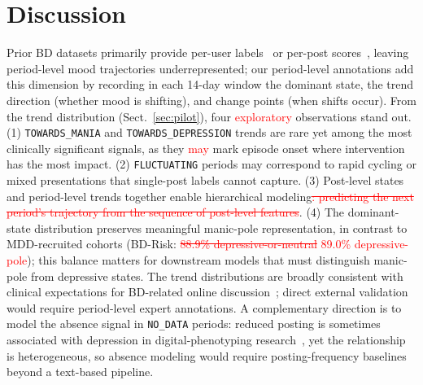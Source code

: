 \documentclass[runningheads]{llncs}
\newcommand{\rev}[1]{\textcolor{red}{#1}}
\newcommand{\del}[1]{\textcolor{red}{\sout{#1}}}
\newcommand{\rev}[1]{#1}
\newcommand{\del}[1]{}
\begin{document}
\section{Discussion}
\label{sec:discussion}

Prior BD datasets primarily provide per-user labels~\cite{cohan2018smhd,sekulic2018not} or per-post scores~\cite{lee2024detecting}, leaving period-level mood trajectories underrepresented; our period-level annotations add this dimension by recording in each 14-day window the dominant state, the trend direction (whether mood is shifting), and change points (when shifts occur). From the trend distribution (Sect.~\ref{sec:pilot}), four \rev{exploratory} observations stand out. (1) \texttt{TOWARDS\_MANIA} and \texttt{TOWARDS\_DEPRESSION} trends are rare yet among the most clinically significant signals, as they \rev{may} mark episode onset where intervention has the most impact. (2) \texttt{FLUCTUATING} periods may correspond to rapid cycling or mixed presentations that single-post labels cannot capture. (3) Post-level states and period-level trends together enable hierarchical modeling\del{: predicting the next period's trajectory from the sequence of post-level features}. (4) The dominant-state distribution preserves meaningful manic-pole representation, in contrast to MDD-recruited cohorts (BD-Risk: \del{88.9\% depressive-or-neutral} \rev{89.0\% depressive-pole}); this balance matters for downstream models that must distinguish manic-pole from depressive states. The trend distributions are broadly consistent with clinical expectations for BD-related online discussion\rev{~\cite{apa2013dsm5,grande2016bipolar}}; direct external validation would require period-level expert annotations. A complementary direction is to model the absence signal in \texttt{NO\_DATA} periods: reduced posting is sometimes associated with depression in digital-phenotyping research~\cite{faurholt2018smartphone}, yet the relationship is heterogeneous, so absence modeling would require posting-frequency baselines beyond a text-based pipeline.
\end{document}
